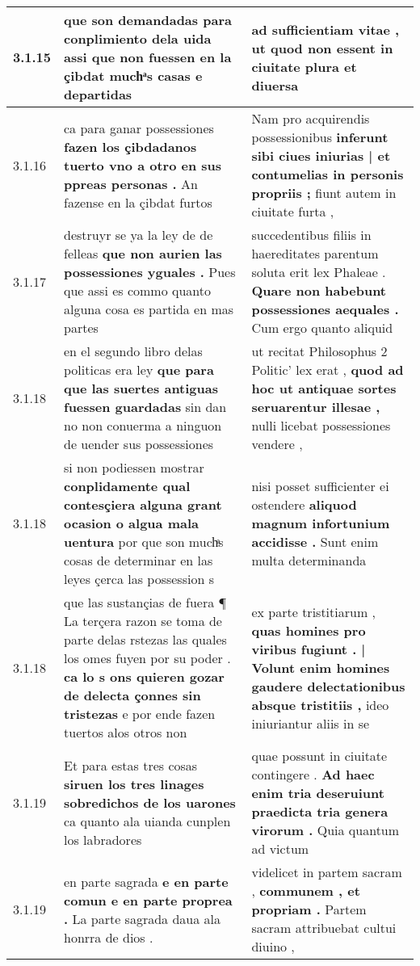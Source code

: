 \begin{tabular}{|p{1cm}|p{6.5cm}|p{6.5cm}|}
3.1.15 & que son demandadas para conplimiento dela uida \textbf{ assi que non fuessen en la çibdat muchͣs casas } e departidas & ad sufficientiam vitae , \textbf{ ut quod non essent in ciuitate plura } et diuersa \\\hline
3.1.16 & ca para ganar possessiones \textbf{ fazen los çibdadanos tuerto vno a otro en sus ppreas personas . } An fazense en la çibdat furtos & Nam pro acquirendis possessionibus \textbf{ inferunt sibi ciues iniurias | et contumelias in personis propriis ; } fiunt autem in ciuitate furta , \\\hline
3.1.17 & destruyr se ya la ley de de felleas \textbf{ que non aurien las possessiones yguales . } Pues que assi es commo quanto alguna cosa es partida en mas partes & succedentibus filiis in haereditates parentum soluta erit lex Phaleae . \textbf{ Quare non habebunt possessiones aequales . } Cum ergo quanto aliquid \\\hline
3.1.18 & en el segundo libro delas politicas era ley \textbf{ que para que las suertes antiguas fuessen guardadas } sin dan no non conuerma a ninguon de uender sus possessiones & ut recitat Philosophus 2 Politic’ lex erat , \textbf{ quod ad hoc ut antiquae sortes seruarentur illesae , } nulli licebat possessiones vendere , \\\hline
3.1.18 & si non podiessen mostrar \textbf{ conplidamente qual contesçiera alguna grant ocasion o algua mala uentura } por que son muchͣs cosas de determinar en las leyes çerca las possession s & nisi posset sufficienter ei ostendere \textbf{ aliquod magnum infortunium accidisse . } Sunt enim multa determinanda \\\hline
3.1.18 & que las sustançias de fuera ¶ La terçera razon se toma de parte delas rstezas las quales los omes fuyen por su poder . \textbf{ ca lo s ons quieren gozar de delecta çonnes sin tristezas } e por ende fazen tuertos alos otros non & ex parte tristitiarum , \textbf{ quas homines pro viribus fugiunt . | Volunt enim homines gaudere delectationibus absque tristitiis , } ideo iniuriantur aliis in se \\\hline
3.1.19 & Et para estas tres cosas \textbf{ siruen los tres linages sobredichos de los uarones } ca quanto ala uianda cunplen los labradores & quae possunt in ciuitate contingere . \textbf{ Ad haec enim tria deseruiunt praedicta tria genera virorum . } Quia quantum ad victum \\\hline
3.1.19 & en parte sagrada \textbf{ e en parte comun e en parte proprea . } La parte sagrada daua ala honrra de dios . & videlicet in partem sacram , \textbf{ communem , et propriam . } Partem sacram attribuebat cultui diuino , \\\hline

\end{tabular}
